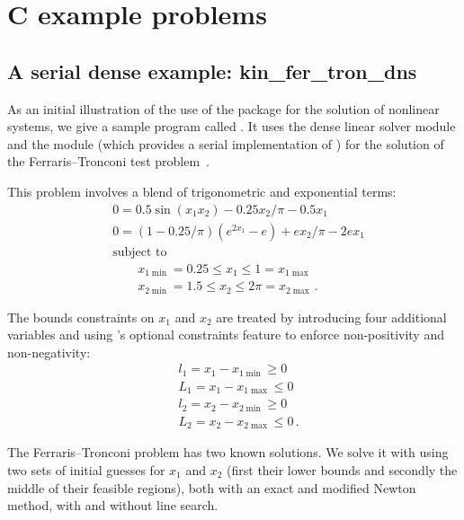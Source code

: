 \section{C example problems}\label{s:ex_c}

\subsection{A serial dense example: kin\_fer\_tron\_dns}\label{ss:kin_fer_tron_dns}

As an initial illustration of the use of the {\kinsol} package for the
solution of nonlinear systems, we give a sample program called .
It uses the {\kinsol} dense linear solver module {\sunlinsoldense} 
and the {\nvecs} module (which provides a serial implementation of {\nvector})
for the solution of the Ferraris--Tronconi test problem~\cite{FlPa:99}.

This problem involves a blend of trigonometric and exponential terms:
\begin{equation}
\begin{split}
  & 0 = 0.5 \sin(x_1 x_2) - 0.25 x_2/\pi - 0.5 x_1 \\
  & 0 = (1-0.25/\pi) ( e^{2 x_1} - e ) + e x_2 / \pi - 2 e x_1 \\
  &\text{subject to } \\
  &\qquad x_{1\min} = 0.25 \le x_1 \le 1 = x_{1\max} \\
  &\qquad x_{2\min} = 1.5 \le x_2 \le 2\pi = x_{2\max} \, .
\end{split}
\end{equation}

The bounds constraints on $x_1$ and $x_2$ are treated by introducing
four additional variables and using {\kinsol}'s optional constraints
feature to enforce non-positivity and non-negativity:
\begin{equation*}
\begin{split}
  &l_1 = x_1 - x_{1\min} \ge 0\\
  &L_1 = x_1 - x_{1\max} \le 0\\
  &l_2 = x_2 - x_{2\min} \ge 0\\
  &L_2 = x_2 - x_{2\max} \le 0 \, .
\end{split}
\end{equation*}

The Ferraris--Tronconi problem has two known solutions. We solve it with
{\kinsol} using two sets of initial guesses for $x_1$ and $x_2$ (first their 
lower bounds and secondly the middle of their feasible regions), both with
an exact and modified Newton method, with and without line search.

